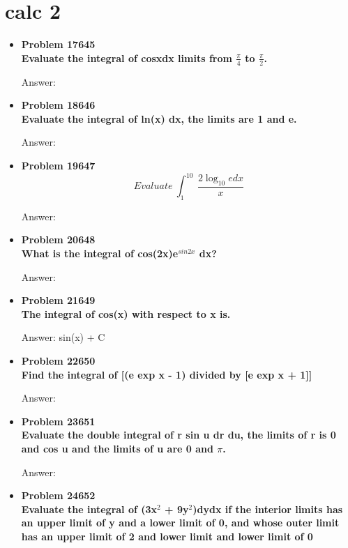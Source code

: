 \documentclass{article}
\begin{document}
\section{calc 2}
\begin{itemize}

    \item\textbf{Problem 17645\\
    Evaluate the integral of cosxdx limits from $\frac{\pi}{4}$ to $\frac{\pi}{2}$.}

    Answer:

    \item\textbf{Problem 18646\\
    Evaluate the integral of ln(x) dx, the limits are 1 and e.}

    Answer:

    \item\textbf{Problem 19647\\}
        \begin{equation}
             Evaluate\ \int_{1}^{10}\ \frac{2\log_{10}edx}{x}
        \end{equation}

    Answer:

    \item\textbf{Problem 20648\\
    What is the integral of cos(2x)e$^{sin2x}$ dx?}

    Answer: 

    \item\textbf{Problem 21649\\
    The integral of cos(x) with respect to x is.}

    Answer: sin(x) + C

    \item\textbf{Problem 22650\\
    Find the integral of [(e exp x - 1) divided by [e exp x + 1]]}

    Answer:

    \item\textbf{Problem 23651\\
    Evaluate the double integral of r sin u dr du, the limits of r is 0 and cos u and the limits of u are 0 and $\pi$.}

    Answer: 

    \item\textbf{Problem 24652\\
    Evaluate the integral of (3x$^2$ + 9y$^2$)dydx if the interior limits has an upper limit of y and a lower limit of 0, and whose outer limit has an upper limit of 2 and lower limit and lower limit of 0}


\end{itemize}
\end{document}
